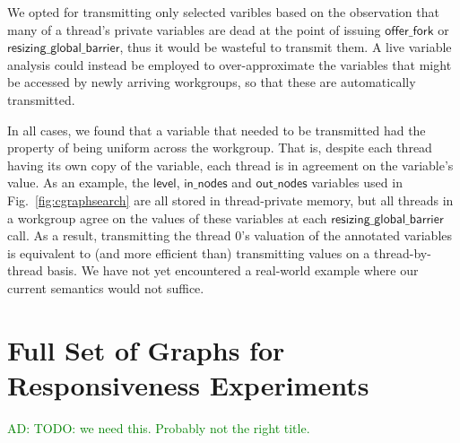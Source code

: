 \documentclass[numbers,nocopyrightspace,10pt]{sigplanconf}
\newcommand{\ADComment}[1]{\textcolor{green}{AD: #1}}
\newcommand{\myfig}{Fig.~}
\newcommand{\offerfork}{\mathsf{offer\_fork}}
\newcommand{\resizingglobalbarrier}{\mathsf{resizing\_global\_barrier}}
\newcommand{\keyword}[1]{\mathsf{#1}}
\begin{document}
We opted for transmitting only selected varibles based on the
observation that many of a thread's private variables are dead at the
point of issuing $\offerfork$ or $\resizingglobalbarrier$, thus it
would be wasteful to transmit them.  A live variable analysis could
instead be employed to over-approximate the variables that might be
accessed by newly arriving workgroups, so that these are automatically
transmitted.

In all cases, we found that a variable that needed to be transmitted
had the property of being uniform across the workgroup.  That is,
despite each thread having its own copy of the variable, each thread
is in agreement on the variable's value.  As an example, the
$\keyword{level}$, $\keyword{in\_nodes}$ and $\keyword{out\_nodes}$
variables used in \myfig\ref{fig:cgraphsearch} are all stored in thread-private
memory, but all threads in a workgroup agree on the values of these
variables at each $\resizingglobalbarrier$ call.  As a result,
transmitting the thread 0's valuation of the annotated variables is
equivalent to (and more efficient than) transmitting values on a
thread-by-thread basis.  We have not yet encountered a real-world
example where our current semantics would not suffice.


\section{Full Set of Graphs for Responsiveness Experiments}

\ADComment{TODO: we need this.  Probably not the right title.}
\end{document}
